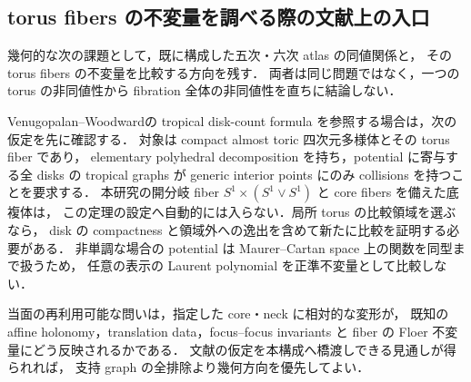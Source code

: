 \subsection{torus fibers の不変量を調べる際の文献上の入口}
\label{nfi24:section}

幾何的な次の課題として，既に構成した五次・六次 atlas の同値関係と，
その torus fibers の不変量を比較する方向を残す．
両者は同じ問題ではなく，一つの torus の非同値性から fibration 全体の非同値性を直ちに結論しない．

Venugopalan--Woodward\cite[Definitions~1.1--1.2, Theorem~1.3]{VenugopalanWoodward2026}の
tropical disk-count formula を参照する場合は，次の仮定を先に確認する．
対象は compact almost toric 四次元多様体とその torus fiber であり，
elementary polyhedral decomposition を持ち，potential に寄与する全 disks の tropical graphs が
generic interior points にのみ collisions を持つことを要求する．
本研究の開分岐 fiber $S^1\times(S^1\vee S^1)$ と core fibers を備えた底複体は，
この定理の設定へ自動的には入らない．局所 torus の比較領域を選ぶなら，
disk の compactness と領域外への逸出を含めて新たに比較を証明する必要がある．
非単調な場合の potential は Maurer--Cartan space 上の関数を同型まで扱うため，
任意の表示の Laurent polynomial を正準不変量として比較しない．

当面の再利用可能な問いは，指定した core・neck に相対的な変形が，
既知の affine holonomy，translation data，focus--focus invariants と
fiber の Floer 不変量にどう反映されるかである．
文献の仮定を本構成へ橋渡しできる見通しが得られれば，
支持 graph の全排除より幾何方向を優先してよい．
